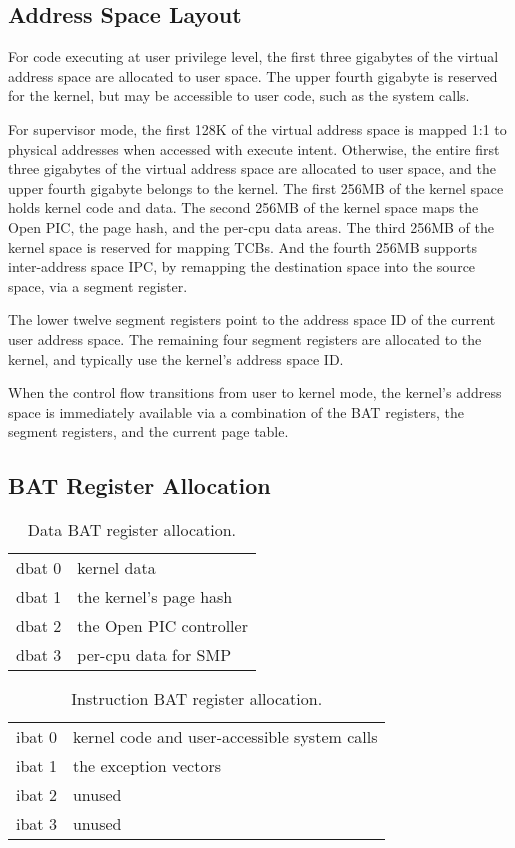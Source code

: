 \documentclass[a4paper]{article}
\newcommand{\openpic}{Open PIC}
\newcommand{\dbat}[1]{dbat #1}
\newcommand{\ibat}[1]{ibat #1}
\begin{document}
\subsection{Address Space Layout}
For code executing at user privilege level, the first three gigabytes of the
virtual address space are allocated to user space.  The upper fourth gigabyte
is reserved for the kernel, but may be accessible to user code, such as
the system calls.

For supervisor mode, the first 128K of the virtual address space is mapped
1:1 to physical addresses when accessed with execute intent.  Otherwise, the
entire first three gigabytes of the virtual address space are allocated to
user space, and the upper fourth gigabyte belongs to the kernel.  The first
256MB of the kernel space holds kernel code and data.  The second 256MB of
the kernel space maps the \openpic{}, the page hash, and the per-cpu data
areas.  The third 256MB of the kernel space is reserved for mapping TCBs.
And the fourth 256MB supports inter-address space IPC, by remapping the 
destination space into the source space, via a segment register.

The lower twelve segment registers point to the address space ID of the current
user address space.  The remaining four segment registers are allocated
to the kernel, and typically use the kernel's address space ID.

When the control flow transitions from user to kernel mode, the kernel's 
address space is immediately available via a combination of the BAT registers,
the segment registers, and the current page table.

\subsection{BAT Register Allocation}

\begin{table}[!h]
\begin{tabular}{ll}
\dbat{0} & kernel data \\
\dbat{1} & the kernel's page hash \\
\dbat{2} & the \openpic{} controller \\
\dbat{3} & per-cpu data for SMP \\
\end{tabular}
\caption{Data BAT register allocation.}
\end{table}

\begin{table}[!h]
\begin{tabular}{ll}
\ibat{0} & kernel code and user-accessible system calls \\
\ibat{1} & the exception vectors \\
\ibat{2} & unused \\
\ibat{3} & unused \\
\end{tabular}
\caption{Instruction BAT register allocation.}
\end{table}
\end{document}
